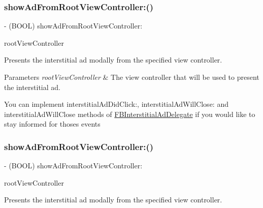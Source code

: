 \subsubsection{\texorpdfstring{show\+Ad\+From\+Root\+View\+Controller\+:()}{showAdFromRootViewController:()}\hspace{0.1cm}{\footnotesize\ttfamily [2/5]}}
{\footnotesize\ttfamily -\/ (B\+O\+OL) show\+Ad\+From\+Root\+View\+Controller\+: \begin{DoxyParamCaption}\item[{(U\+I\+View\+Controller $\ast$)}]{root\+View\+Controller }\end{DoxyParamCaption}}

Presents the interstitial ad modally from the specified view controller.


\begin{DoxyParams}{Parameters}
{\em root\+View\+Controller} & The view controller that will be used to present the interstitial ad.\\
\hline
\end{DoxyParams}
You can implement {\ttfamily interstitial\+Ad\+Did\+Click\+:}, {\ttfamily interstitial\+Ad\+Will\+Close\+:} and {\ttfamily interstitial\+Ad\+Will\+Close} methods of {\ttfamily \hyperlink{classFBInterstitialAdDelegate-p}{F\+B\+Interstitial\+Ad\+Delegate}} if you would like to stay informed for thoses events \mbox{\label{interfaceFBInterstitialAd_ac9c071a5f699e990e1fa65060fe5c1ce}} 
\subsubsection{\texorpdfstring{show\+Ad\+From\+Root\+View\+Controller\+:()}{showAdFromRootViewController:()}\hspace{0.1cm}{\footnotesize\ttfamily [3/5]}}
{\footnotesize\ttfamily -\/ (B\+O\+OL) show\+Ad\+From\+Root\+View\+Controller\+: \begin{DoxyParamCaption}\item[{(U\+I\+View\+Controller $\ast$)}]{root\+View\+Controller }\end{DoxyParamCaption}}

Presents the interstitial ad modally from the specified view controller.



